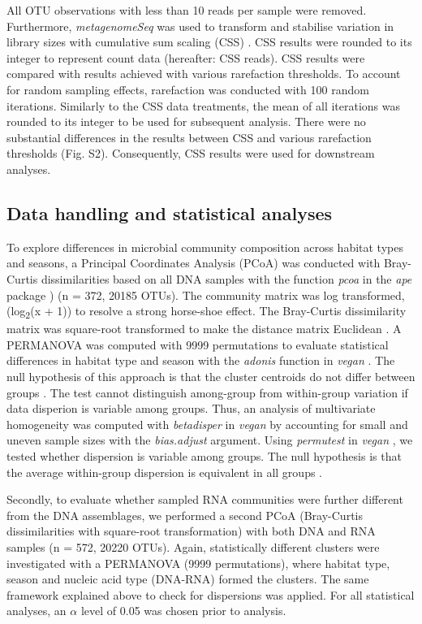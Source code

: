\documentclass[12pt,a4paper]{article} %
\begin{document}
All OTU observations with less than 10 reads per sample were removed. Furthermore, \textit{metagenomeSeq} was used to transform and stabilise variation in library sizes with cumulative sum scaling (CSS) \citep{Paulson2013}. CSS results were rounded to its integer to represent count data (hereafter: CSS reads). CSS results were compared with results achieved with various rarefaction thresholds. To account for random sampling effects, rarefaction was conducted with 100 random iterations. Similarly to the CSS data treatments, the mean of all iterations was rounded to its integer to be used for subsequent analysis. There were no substantial differences in the results between CSS and various rarefaction thresholds (Fig. S2). Consequently, CSS results were used for downstream analyses.

\subsection*{Data handling and statistical analyses}
To explore differences in microbial community composition across habitat types and seasons, a Principal Coordinates Analysis (PCoA) was conducted with Bray-Curtis dissimilarities based on all DNA samples with the function \textit{pcoa} in the \textit{ape} package \citep{Paradis2018}) (n = 372, 20185 OTUs). The community matrix was log transformed, (log\textsubscript{2}(x + 1)) to resolve a strong horse-shoe effect. The Bray-Curtis dissimilarity matrix was square-root transformed to make the distance matrix Euclidean \citep{Legendre1998, Borcard2011}. A PERMANOVA was computed with 9999 permutations to evaluate statistical differences in habitat type and season  with the \textit{adonis} function in \textit{vegan} \citep{Oksanen2017}. The null hypothesis of this approach is that the cluster centroids do not differ between groups \citep{Anderson2013}. The test cannot distinguish among-group from within-group variation if data disperion is variable among groups. Thus, an analysis of multivariate homogeneity was computed with \textit{betadisper} in \textit{vegan} \citep{Oksanen2017} by accounting for small and uneven sample sizes with the \textit{bias.adjust} argument. Using \textit{permutest} in \textit{vegan} \citep{Oksanen2017}, we tested whether dispersion is variable among groups. The null hypothesis is that the average within-group dispersion is equivalent in all groups \citep{Anderson2013}.

Secondly, to evaluate whether sampled RNA communities were further different from the DNA assemblages, we performed a second PCoA (Bray-Curtis dissimilarities with square-root transformation) with both DNA and RNA samples (n = 572, 20220 OTUs). Again, statistically different clusters were investigated with a PERMANOVA (9999 permutations), where habitat type, season and nucleic acid type (DNA-RNA) formed the clusters. The same framework explained above to check for dispersions was applied. For all statistical analyses, an $\alpha$ level of 0.05 was chosen prior to analysis.
\end{document}
